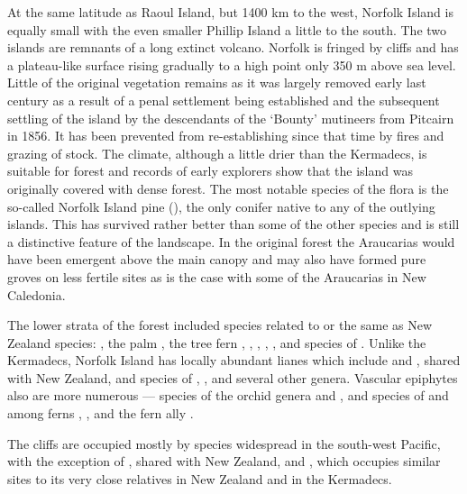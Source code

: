 At the same latitude as Raoul Island, but 1400 km to the west, Norfolk Island is equally small with the even smaller Phillip Island a little to the south.
The two islands are remnants of a long extinct volcano.
Norfolk is fringed by cliffs and has a plateau-like surface rising gradually to a high point only 350 m above sea level.
Little of the original vegetation remains as it was largely removed early last century as a result of a penal settlement being established and the subsequent settling of the island by the descendants of the `Bounty' mutineers from Pitcairn in 1856.
It has been prevented from re-establishing since that time by fires and grazing of stock.
The climate, although a little drier than the Kermadecs, is suitable for forest and records of early explorers show that the island was originally covered with dense forest.
The most notable species of the flora is the so-called Norfolk Island pine (), the only conifer native to any of the outlying islands.
This has survived rather better than some of the other species and is still a distinctive feature of the landscape.
In the original forest the Araucarias would have been emergent above the main canopy and may also have formed pure groves on less fertile sites as is the case with some of the Araucarias in New Caledonia.

The lower strata of the forest included species related to or the same as New Zealand species: , the palm , the tree fern , , , , ,  and species of .
Unlike the Kermadecs, Norfolk Island has locally abundant lianes which include  and , shared with New Zealand, and species of , ,  and several other genera.
Vascular epiphytes also are more numerous --- species of the orchid genera  and , and species of  and among ferns , ,  and the fern ally .

The cliffs are occupied mostly by species widespread in the south-west Pacific, with the exception of , shared with New Zealand, and , which occupies similar sites to its very close relatives  in New Zealand and  in the Kermadecs.

